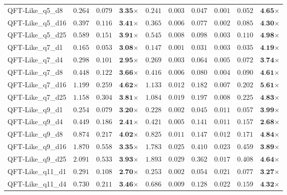 \begin{table*}[t]
{\begin{tabular}{| l || r r c || r r r r r c |}
QFT-Like\_q5\_d8 & $0.264$ & $0.079$ & $\textbf{3.35}$$\times$ & $0.241$ & $0.003$ & $0.047$ & $0.001$ & $0.052$ & $\textbf{4.65}$$\times$ \\
QFT-Like\_q5\_d16 & $0.397$ & $0.116$ & $\textbf{3.41}$$\times$ & $0.365$ & $0.006$ & $0.077$ & $0.002$ & $0.085$ & $\textbf{4.30}$$\times$ \\
QFT-Like\_q5\_d25 & $0.589$ & $0.151$ & $\textbf{3.91}$$\times$ & $0.545$ & $0.008$ & $0.098$ & $0.003$ & $0.110$ & $\textbf{4.98}$$\times$ \\
QFT-Like\_q7\_d1 & $0.165$ & $0.053$ & $\textbf{3.08}$$\times$ & $0.147$ & $0.001$ & $0.031$ & $0.003$ & $0.035$ & $\textbf{4.19}$$\times$ \\
QFT-Like\_q7\_d4 & $0.298$ & $0.101$ & $\textbf{2.95}$$\times$ & $0.269$ & $0.003$ & $0.064$ & $0.005$ & $0.072$ & $\textbf{3.74}$$\times$ \\
QFT-Like\_q7\_d8 & $0.448$ & $0.122$ & $\textbf{3.66}$$\times$ & $0.416$ & $0.006$ & $0.080$ & $0.004$ & $0.090$ & $\textbf{4.61}$$\times$ \\
QFT-Like\_q7\_d16 & $1.199$ & $0.259$ & $\textbf{4.62}$$\times$ & $1.133$ & $0.012$ & $0.182$ & $0.007$ & $0.202$ & $\textbf{5.61}$$\times$ \\
QFT-Like\_q7\_d25 & $1.158$ & $0.304$ & $\textbf{3.81}$$\times$ & $1.084$ & $0.019$ & $0.197$ & $0.008$ & $0.225$ & $\textbf{4.83}$$\times$ \\
QFT-Like\_q9\_d1 & $0.254$ & $0.079$ & $\textbf{3.20}$$\times$ & $0.228$ & $0.002$ & $0.045$ & $0.011$ & $0.057$ & $\textbf{3.99}$$\times$ \\
QFT-Like\_q9\_d4 & $0.449$ & $0.186$ & $\textbf{2.41}$$\times$ & $0.421$ & $0.005$ & $0.141$ & $0.011$ & $0.157$ & $\textbf{2.68}$$\times$ \\
QFT-Like\_q9\_d8 & $0.874$ & $0.217$ & $\textbf{4.02}$$\times$ & $0.825$ & $0.011$ & $0.147$ & $0.012$ & $0.171$ & $\textbf{4.84}$$\times$ \\
QFT-Like\_q9\_d16 & $1.870$ & $0.558$ & $\textbf{3.35}$$\times$ & $1.783$ & $0.025$ & $0.410$ & $0.023$ & $0.459$ & $\textbf{3.89}$$\times$ \\
QFT-Like\_q9\_d25 & $2.091$ & $0.533$ & $\textbf{3.93}$$\times$ & $1.893$ & $0.029$ & $0.362$ & $0.017$ & $0.408$ & $\textbf{4.64}$$\times$ \\
QFT-Like\_q11\_d1 & $0.291$ & $0.108$ & $\textbf{2.70}$$\times$ & $0.253$ & $0.002$ & $0.054$ & $0.021$ & $0.077$ & $\textbf{3.27}$$\times$ \\
QFT-Like\_q11\_d4 & $0.730$ & $0.211$ & $\textbf{3.46}$$\times$ & $0.686$ & $0.009$ & $0.128$ & $0.022$ & $0.159$ & $\textbf{4.32}$$\times$ \\

\end{tabular}}
\end{table*}
